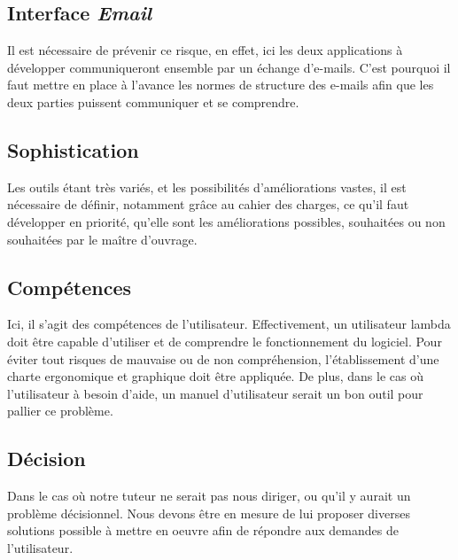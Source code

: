 \documentclass[etudiants]{support-iutrs}
\begin{document}
\subsection{Interface \emph{Email}}

Il est nécessaire de prévenir ce risque, en effet, ici les deux applications à développer communiqueront ensemble par un échange d'e-mails. C'est pourquoi il faut mettre en place à l'avance les normes de structure des e-mails afin que les deux parties  puissent communiquer et se comprendre.

\subsection{Sophistication}

Les outils étant très variés, et les possibilités d'améliorations vastes, il est nécessaire de définir, notamment grâce au cahier des charges, ce qu'il faut développer en priorité, qu'elle sont les améliorations possibles, souhaitées ou non souhaitées par le maître d'ouvrage.

\subsection{Compétences}

Ici, il s'agit des compétences de l'utilisateur. Effectivement, un utilisateur lambda doit être capable d'utiliser et de comprendre le fonctionnement du logiciel. Pour éviter tout risques de mauvaise ou de non compréhension, l'établissement d'une charte ergonomique et graphique doit être appliquée. De plus, dans le cas où l'utilisateur à besoin d'aide, un manuel d'utilisateur serait un bon outil pour pallier ce problème.

\subsection{Décision}

Dans le cas où notre tuteur ne serait pas nous diriger, ou qu'il y aurait un problème décisionnel. Nous devons être en mesure de lui proposer diverses solutions possible à mettre en oeuvre afin de répondre aux demandes de l'utilisateur.  
\end{document}
